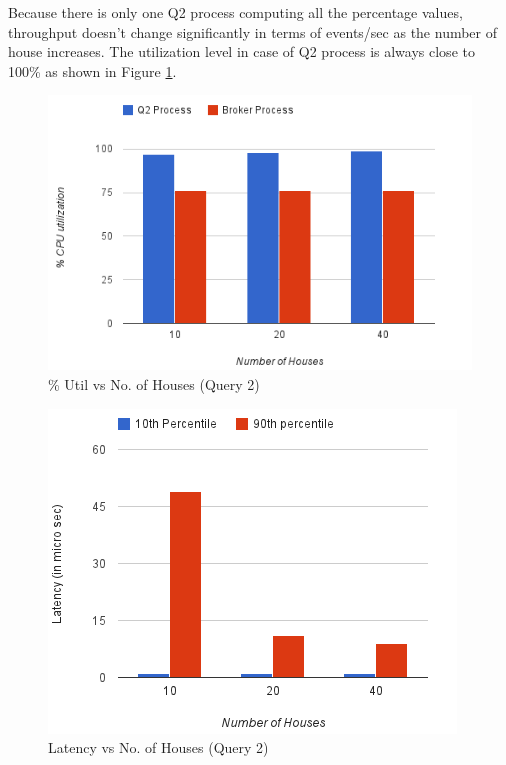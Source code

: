 \vspace*{-0.5cm}
Because there is only one Q2 process computing all the percentage values, throughput doesn't change significantly in terms of events/sec as the number of house increases.
The utilization level in case of Q2 process is always close to 100\% as shown in Figure \ref{fig:q2_util}.

\begin{figure}[h]
\begin{center}
	\includegraphics[scale=0.55]{img/q2_utilization}
	\vspace*{-0.3cm}
	\caption{\% Util vs No.
of Houses (Query 2) \label{fig:q2_util}}
\end{center}
\end{figure}

\vspace*{-0.4cm}

\begin{figure}[h]
\begin{center}
	\includegraphics[scale=0.6]{img/q2_latency}
	\vspace*{-0.3cm}
	\caption{Latency vs No.
of Houses (Query 2) \label{fig:q2_latency}}
\end{center}
\end{figure}

